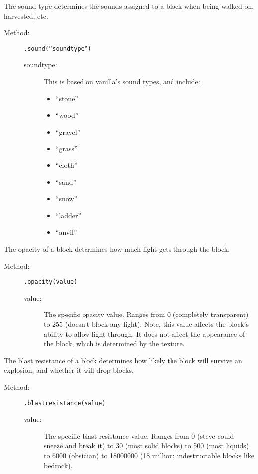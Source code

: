 \documentclass[letterpaper,titlepage,12pt]{article}
\begin{document}
The sound type determines the sounds assigned to a block when being walked on, harvested, etc.  

\begin{description}
\item[Method:] \texttt{.sound(``soundtype'')}
\begin{description}
\item [soundtype:] This is based on vanilla's sound types, and include:
\begin{multicols}{3}
\begin{itemize}
\item ``stone''
\item ``wood''
\item ``gravel''
\item ``grass''
\item ``cloth''
\item ``sand''
\item ``snow''
\item ``ladder''
\item ``anvil''
\end{itemize}
\end{multicols}
\end{description}
\end{description}

The opacity of a block determines how much light gets through the block.

\begin{description}
\item[Method:] \texttt{.opacity(value)}
\begin{description}
\item [value:] The specific opacity value.  Ranges from 0 (completely transparent) to 255 (doesn't block any light).  Note, this value affects the block's ability to allow light through.  It does not affect the appearance of the block, which is determined by the texture.
\end{description}
\end{description}

The blast resistance of a block determines how likely the block will survive an explosion, and whether it will drop blocks.

\begin{description}
\item[Method:] \texttt{.blastresistance(value)}
\begin{description}
\item [value:] The specific blast resistance value.  Ranges from 0 (steve could sneeze and break it) to 30 (most solid blocks) to 500 (most liquids) to 6000 (obsidian) to 18000000 (18 million; indestructable blocks like bedrock).
\end{description}
\end{description}
\end{document}

